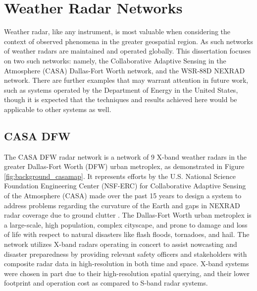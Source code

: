 \section{Weather Radar Networks}
\label{sec:background_networks}

Weather radar, like any instrument, is most valuable when considering the context of observed phenomena in the greater geospatial region. 
As such networks of weather radars are maintained and operated globally. 
This dissertation focuses on two such networks: namely, the Collaborative Adaptive Sensing in the Atmosphere (CASA) Dallas-Fort Worth network, and the WSR-88D NEXRAD network. 
There are further examples that may warrant attention in future work, such as systems operated by the Department of Energy in the United States, though it is expected that the techniques and results achieved here would be applicable to other systems as well.

\subsection{CASA DFW}
\label{ssec:background_casadfw}

The CASA DFW radar network is a network of 9 X-band weather radars in the greater Dallas-Fort Worth (DFW) urban metroplex, as demonstrated in Figure \ref{fig:background_casamap}. 
It represents efforts by the U.S. National Science Foundation Engineering Center (NSF-ERC) for Collaborative Adaptive Sensing of the Atmosphere (CASA) made over the past 15 years to design a system to address problems regarding the curvature of the Earth and gaps in NEXRAD radar coverage due to ground clutter \cite{chen2015quantitative}. 
The Dallas-Fort Worth urban metroplex is a large-scale, high population, complex cityscape, and prone to damage and loss of life with respect to natural disasters like flash floods, tornadoes, and hail. 
The network utilizes X-band radars operating in concert to assist nowcasting and disaster preparedness by providing relevant safety officers and stakeholders with composite radar data in high-resolution in both time and space. 
X-band systems were chosen in part due to their high-resolution spatial querying, and their lower footprint and operation cost as compared to S-band radar systems.

